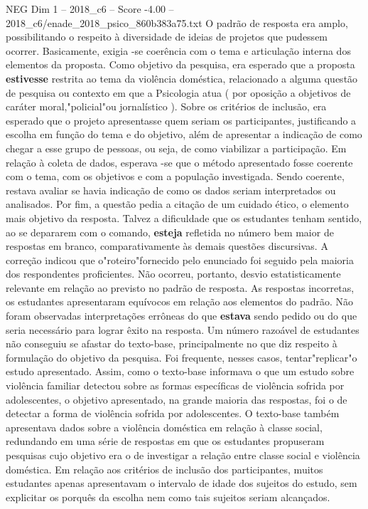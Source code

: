 \begin{textsample}{NEG Dim 1 – 2018\_c6 – Score -4.00 – 2018\_c6/enade\_2018\_psico\_860b383a75.txt}
O padrão de resposta era amplo, possibilitando o respeito à diversidade de ideias de projetos que pudessem ocorrer.
Basicamente, exigia -se coerência com o tema e articulação interna dos elementos da proposta.
Como objetivo da pesquisa, era esperado que a proposta \textbf{estivesse} restrita ao tema da violência doméstica, relacionado a alguma questão de pesquisa ou contexto em que a Psicologia atua ( por oposição a objetivos de caráter moral,"policial"ou jornalístico ).
Sobre os critérios de inclusão, era esperado que o projeto apresentasse quem seriam os participantes, justificando a escolha em função do tema e do objetivo, além de apresentar a indicação de como chegar a esse grupo de pessoas, ou seja, de como viabilizar a participação.
Em relação à coleta de dados, esperava -se que o método apresentado fosse coerente com o tema, com os objetivos e com a população investigada.
Sendo coerente, restava avaliar se havia indicação de como os dados seriam interpretados ou analisados.
Por fim, a questão pedia a citação de um cuidado ético, o elemento mais objetivo da resposta.
Talvez a dificuldade que os estudantes tenham sentido, ao se depararem com o comando, \textbf{esteja} refletida no número bem maior de respostas em branco, comparativamente às demais questões discursivas.
A correção indicou que o"roteiro"fornecido pelo enunciado foi seguido pela maioria dos respondentes proficientes.
Não ocorreu, portanto, desvio estatisticamente relevante em relação ao previsto no padrão de resposta.
As respostas incorretas, os estudantes apresentaram equívocos em relação aos elementos do padrão.
Não foram observadas interpretações errôneas do que \textbf{estava} sendo pedido ou do que seria necessário para lograr êxito na resposta.
Um número razoável de estudantes não conseguiu se afastar do texto-base, principalmente no que diz respeito à formulação do objetivo da pesquisa.
Foi frequente, nesses casos, tentar"replicar"o estudo apresentado.
Assim, como o texto-base informava o que um estudo sobre violência familiar detectou sobre as formas específicas de violência sofrida por adolescentes, o objetivo apresentado, na grande maioria das respostas, foi o de detectar a forma de violência sofrida por adolescentes.
O texto-base também apresentava dados sobre a violência doméstica em relação à classe social, redundando em uma série de respostas em que os estudantes propuseram pesquisas cujo objetivo era o de investigar a relação entre classe social e violência doméstica.
Em relação aos critérios de inclusão dos participantes, muitos estudantes apenas apresentavam o intervalo de idade dos sujeitos do estudo, sem explicitar os porquês da escolha nem como tais sujeitos seriam alcançados.

\end{textsample}
